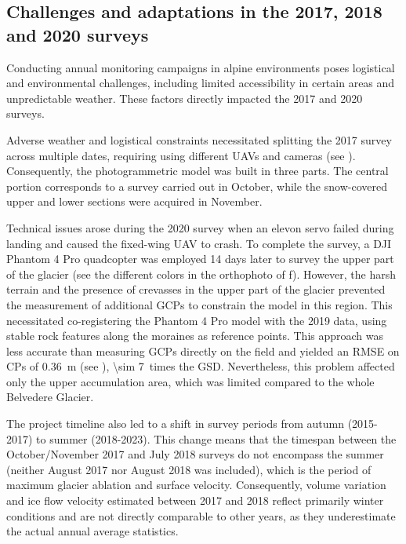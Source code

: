 \subsection{Challenges and adaptations in the 2017, 2018 and 2020 surveys}\label{sec:3:problems} 

Conducting annual monitoring campaigns in alpine environments poses logistical and environmental
challenges, including limited accessibility in certain areas and unpredictable weather. 
These factors directly impacted the 2017 and 2020 surveys.

Adverse weather and logistical constraints necessitated splitting the 2017 survey across 
multiple dates, requiring using different UAVs and cameras (see ). 
Consequently, the photogrammetric model was built in three parts. 
The central portion corresponds to a survey carried out in October, while the snow-covered 
upper and lower sections were acquired in November.

Technical issues arose during the 2020 survey when an elevon servo failed during landing and
caused the fixed-wing UAV to crash.
To complete the survey, a DJI Phantom 4 Pro quadcopter was employed 14 days later to survey 
the upper part of the glacier (see the different colors in the orthophoto of
f).
However, the harsh terrain and the presence of crevasses in the upper part of the glacier 
prevented the measurement of additional GCPs to constrain the model in this region. 
This necessitated co-registering the Phantom 4 Pro model with the 2019 data, 
using stable rock features along the moraines as reference points. 
This approach was less accurate than measuring GCPs directly on the field and yielded an
RMSE on CPs of \SI{0.36}{\meter} (see ), \SI{\sim 7}{}~times the GSD.
Nevertheless, this problem affected only the upper accumulation area, which was limited compared to the whole Belvedere Glacier.

The project timeline also led to a shift in survey periods from autumn (2015-2017) 
to summer (2018-2023).
This change means that the timespan between the October/November 2017 and July 2018 
surveys do not encompass the summer (neither August 2017 nor August 2018 was included), 
which is the period of maximum glacier ablation and surface velocity. 
Consequently, volume variation and ice flow velocity estimated between 2017 and 2018 reflect
primarily winter conditions and are not directly comparable to other years, as they underestimate
the actual annual average statistics.

